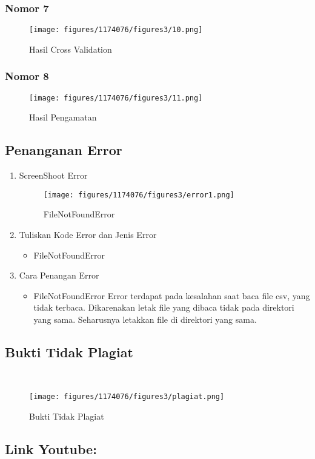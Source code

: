 \subsubsection{Nomor 7}
\hfill\break

\begin{figure}[H]
\centerline{\texttt{[image: figures/1174076/figures3/10.png]}}
\caption{Hasil Cross Validation}
\label{labelgambar}
\end{figure}

\subsubsection{Nomor 8}
\hfill\break

\begin{figure}[H]
\centerline{\texttt{[image: figures/1174076/figures3/11.png]}}
\caption{Hasil Pengamatan }
\label{labelgambar}
\end{figure}

\subsection{Penanganan Error}
\begin{enumerate}
	\item ScreenShoot Error
	\begin{figure}[H]
		\texttt{[image: figures/1174076/figures3/error1.png]}
		\centering
		\caption{FileNotFoundError}
	\end{figure}
	\item Tuliskan Kode Error dan Jenis Error
	\begin{itemize}
		\item FileNotFoundError
	\end{itemize}
	\item Cara Penangan Error
	\begin{itemize}
		\item FileNotFoundError
		\hfill\break
		Error terdapat pada kesalahan saat baca file csv, yang tidak terbaca. Dikarenakan letak file yang dibaca tidak pada direktori yang sama. Seharusnya letakkan file di direktori yang sama. 
	\end{itemize}
\end{enumerate}


\subsection{Bukti Tidak Plagiat}
\hfill\\
\begin{figure}[H]
\centerline{\texttt{[image: figures/1174076/figures3/plagiat.png]}}
\caption{Bukti Tidak Plagiat}
\label{labelgambar}
\end{figure}

\subsection{Link Youtube:}

